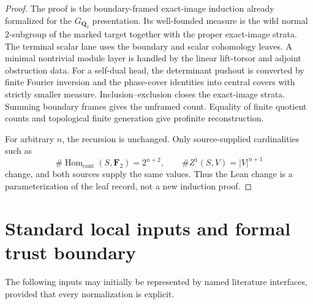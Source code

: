 \documentclass[11pt,reqno]{amsart}
\theoremstyle{remark}
\numberwithin{equation}{section}
\newcommand{\Q}{\mathbf Q}
\newcommand{\F}{\mathbf F}
\newcommand{\Hom}{\operatorname{Hom}}
\begin{document}
\begin{proof}
The proof is the boundary-framed exact-image induction already formalized
for the \(G_{\Q_2}\) presentation.  Its well-founded measure is the wild
normal \(2\)-subgroup of the marked target together with the proper
exact-image strata.  The terminal scalar lane uses the boundary and
scalar cohomology leaves.  A minimal nontrivial module layer is handled by
the linear lift-torsor and adjoint obstruction data.  For a self-dual
head, the determinant pushout is converted by finite Fourier inversion
and the phase-cover identities into central covers with strictly smaller
measure.  Inclusion--exclusion closes the exact-image strata.  Summing
boundary frames gives the unframed count.  Equality of finite quotient
counts and topological finite generation give profinite reconstruction.

For arbitrary \(n\), the recursion is unchanged.  Only source-supplied
cardinalities such as
\[
 \#\Hom_{\mathrm{cont}}(S,\F_2)=2^{n+2},
 \qquad \#Z^1(S,V)=|V|^{n+1}
\]
change, and both sources supply the same values.  Thus the Lean change is
a parameterization of the leaf record, not a new induction proof.
\end{proof}

\section{Standard local inputs and formal trust boundary}
\label{sec:local-inputs}

The following inputs may initially be represented by named literature
interfaces, provided that every normalization is explicit.
\end{document}
